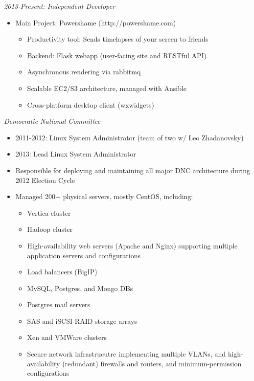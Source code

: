 \documentclass[11pt]{res} %
\begin{document}
\begin{resume}
{\sl 2013-Present: Independent Developer }
\begin{itemize} 
    \item Main Project: Powershame (http://powershame.com)
        \begin{itemize}
            \item Productivity tool: Sends timelapses of your screen to friends
            \item Backend: Flask webapp (user-facing site and RESTful API)
            \item Asynchronous rendering via rabbitmq
            \item Scalable EC2/S3 architecture, managed with Ansible
            \item Cross-platform desktop client (wxwidgets)
        \end{itemize}
    \end{itemize}
\sl{Democratic National Committee} 
        \begin{itemize}
            \item 2011-2012: Linux System Administrator (team of two w/ Leo Zhadanovsky)
            \item 2013: Lead Linux System Administrator
            \item Responsible for deploying and maintaining all major DNC architecture during 2012 Election Cycle
            \item Managed 200+ physical servers, mostly CentOS, including:
                \begin{itemize}
                    \item Vertica cluster
                    \item Hadoop cluster
                    \item High-availability web servers (Apache and Nginx) supporting multiple application servers and configurations
                    \item Load balancers (BigIP)
                    \item MySQL, Postgres, and Mongo DBs
                    \item Postgres mail servers
                    \item SAS and iSCSI RAID storage arrays
                    \item Xen and VMWare clusters
                    \item Secure network infrastrucutre implementing multiple VLANs, and high-availability (redundant) firewalls and routers, and minimum-permission configurations

\end{itemize}
\end{itemize}
\end{resume}
\end{document}
